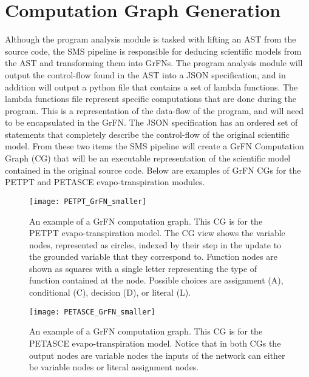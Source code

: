 \section{Computation Graph Generation\label{sec:cg_gen}}
Although the program analysis module is tasked with lifting an AST from the source code, the SMS pipeline is responsible for deducing scientific models from the AST and transforming them into GrFNs.
The program analysis module will output the control-flow found in the AST into a JSON specification, and in addition will output a python file that contains a set of lambda functions.
The lambda functions file represent specific computations that are done during the program.
This is a representation of the data-flow of the program, and will need to be encapsulated in the GrFN.
The JSON specification has an ordered set of statements that completely describe the control-flow of the original scientific model.
From these two items the SMS pipeline will create a GrFN Computation Graph (CG) that will be an executable representation of the scientific model contained in the original source code.
Below are examples of GrFN CGs for the PETPT and PETASCE evapo-transpiration modules.

\FloatBarrier
\begin{figure}[!htbp]
    \label{petpt_grfn}
    \centering
    \texttt{[image: PETPT\_GrFN\_smaller]}%
    \caption[PETPT GrFN Computation Graph]{An example of a GrFN computation graph. This CG is for the PETPT evapo-transpiration model. The CG view shows the variable nodes, represented as circles, indexed by their step in the update to the grounded variable that they correspond to. Function nodes are shown as squares with a single letter representing the type of function contained at the node. Possible choices are assignment (A), conditional (C), decision (D), or literal (L).}
\end{figure}
\FloatBarrier

\FloatBarrier
\begin{figure}[!htbp]
    \label{petasce_grfn}
    \centering
    \texttt{[image: PETASCE\_GrFN\_smaller]}%
    \caption[PETASCE GrFN Computation Graph]{An example of a GrFN computation graph. This CG is for the PETASCE evapo-transpiration model. Notice that in both CGs the output nodes are variable nodes the inputs of the network can either be variable nodes or literal assignment nodes.}
\end{figure}
\FloatBarrier


